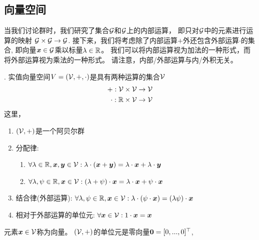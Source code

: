 \subsection{向量空间}

当我们讨论群时，我们研究了集合$\mathcal{G}$和$\mathcal{G}$上的内部运算，
即只对$\mathcal{G}$中的元素进行运算的映射
$\mathcal{G} \times \mathcal{G} \rightarrow \mathcal{G}$.
接下来，我们将考虑除了内部运算$+$外还包含外部运算$\cdot$的集合,
即向量$\boldsymbol{x} \in \mathcal{G}$乘以标量$\lambda \in \mathbb{R}$。
我们可以将内部运算视为加法的一种形式，而将外部运算视为乘法的一种形式。
请注意，内部/外部运算与内/外积无关。

\begin{definition}[向量空间].
    实值向量空间$V = (\mathcal{V}, +, \cdot)$是具有两种运算的集合$\mathcal{V}$
    \begin{align}
        + : \mathcal{V} \times \mathcal{V} \rightarrow \mathcal{V} \\
        \cdot : \mathbb{R} \times \mathcal{V} \rightarrow \mathcal{V}
    \end{align}
    这里，
    \begin{enumerate}
        \item $(\mathcal{V}, +)$是一个阿贝尔群
        \item 分配律:
              \begin{enumerate}
                  \item $
                        \forall \lambda \in \mathbb{R},
                        \boldsymbol{x}, \boldsymbol{y} \in \mathcal{V}:
                        \lambda \cdot (\boldsymbol{x} + \boldsymbol{y}) =
                        \lambda \cdot \boldsymbol{x} +
                        \lambda \cdot \boldsymbol{y}$
                  \item $
                        \forall \lambda,\psi \in \mathbb{R},
                        \boldsymbol{x} \in \mathcal{V}:
                        (\lambda + \psi ) \cdot \boldsymbol{x}=
                        \lambda \cdot \boldsymbol{x} +
                        \psi \cdot \boldsymbol{x}
                        $
              \end{enumerate}
        \item 结合律(外部运算):
              $\forall \lambda,\psi \in \mathbb{R},
              \boldsymbol{x} \in \mathcal{V}:
              \lambda \cdot (\psi \cdot \boldsymbol{x} ) =
              (\lambda \psi)\cdot \boldsymbol{x}$
        \item 相对于外部运算的单位元:
              $\forall \boldsymbol{x} \in \mathcal{V}
              : 1 \cdot \boldsymbol{x} = \boldsymbol{x}$
    \end{enumerate}
\end{definition}
元素$\boldsymbol{x} \in \mathcal{V}$称为向量。
$(\mathcal{V}, +)$的单位元是零向量$\boldsymbol{0}=[0,...,0]^\top$,
